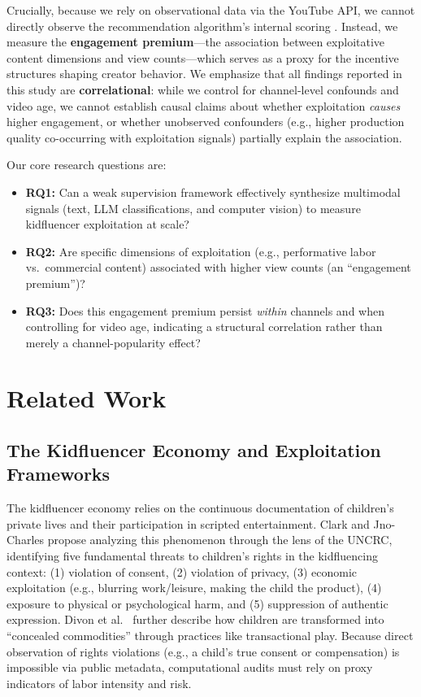 \documentclass[]{ieeeaccess}
\begin{document}
Crucially, because we rely on observational data via the YouTube API, we cannot directly observe the recommendation algorithm's internal scoring \cite{bouchaud2024auditing,rieder2018ranking}. Instead, we measure the \textbf{engagement premium}---the association between exploitative content dimensions and view counts---which serves as a proxy for the incentive structures shaping creator behavior. We emphasize that all findings reported in this study are \textbf{correlational}: while we control for channel-level confounds and video age, we cannot establish causal claims about whether exploitation \emph{causes} higher engagement, or whether unobserved confounders (e.g., higher production quality co-occurring with exploitation signals) partially explain the association.

Our core research questions are:
\begin{itemize}
    \item \textbf{RQ1:} Can a weak supervision framework effectively synthesize multimodal signals (text, LLM classifications, and computer vision) to measure kidfluencer exploitation at scale?
    \item \textbf{RQ2:} Are specific dimensions of exploitation (e.g., performative labor vs.\ commercial content) associated with higher view counts (an ``engagement premium'')?
    \item \textbf{RQ3:} Does this engagement premium persist \emph{within} channels and when controlling for video age, indicating a structural correlation rather than merely a channel-popularity effect?
\end{itemize}

\section{Related Work}

\subsection{The Kidfluencer Economy and Exploitation Frameworks}

The kidfluencer economy relies on the continuous documentation of children's private lives and their participation in scripted entertainment. Clark and Jno-Charles \cite{clark2025child} propose analyzing this phenomenon through the lens of the UNCRC, identifying five fundamental threats to children's rights in the kidfluencing context: (1) violation of consent, (2) violation of privacy, (3) economic exploitation (e.g., blurring work/leisure, making the child the product), (4) exposure to physical or psychological harm, and (5) suppression of authentic expression. Divon et al.\ \cite{divon2025children} further describe how children are transformed into ``concealed commodities'' through practices like transactional play. Because direct observation of rights violations (e.g., a child's true consent or compensation) is impossible via public metadata, computational audits must rely on proxy indicators of labor intensity and risk.
\end{document}
